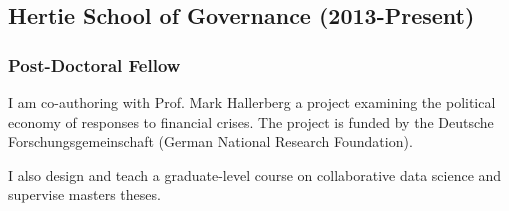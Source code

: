 \documentclass[a4paper]{article}
\begin{document}
\subsection*{Hertie School of Governance (2013-Present)}

\subsubsection*{Post-Doctoral Fellow}

I am co-authoring with Prof. Mark Hallerberg a project examining the political economy of responses to financial crises. The project is funded by the Deutsche Forschungsgemeinschaft (German National Research Foundation).\vspace{0.25cm}

\noindent I also design and teach a graduate-level course on collaborative data science and supervise masters theses.
\end{document}
